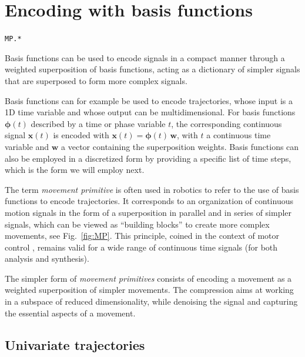 \documentclass[10pt,a4paper]{article} %
\newcommand{\filename}[1]{\colorbox{rr2}{\color{white}\texttt{#1}}}
\begin{document}
\section{Encoding with basis functions}\label{sec:basisfcts}
\begin{flushright}
\filename{MP.*}
\end{flushright}

Basis functions can be used to encode signals in a compact manner through a weighted superposition of basis functions, acting as a dictionary of simpler signals that are superposed to form more complex signals. %

Basis functions can for example be used to encode trajectories, whose input is a 1D time variable and whose output can be multidimensional. For basis functions $\bm{\phi}(t)$ described by a time or phase variable $t$, the corresponding continuous signal $\bm{x}(t)$ is encoded with $\bm{x}(t) = \bm{\phi}(t) \, \bm{w}$, with $t$ a continuous time variable and $\bm{w}$ a vector containing the superposition weights. Basis functions can also be employed in a discretized form by providing a specific list of time steps, which is the form we will employ next. 

The term \emph{movement primitive} is often used in robotics to refer to the use of basis functions to encode trajectories. It corresponds to an organization of continuous motion signals in the form of a superposition in parallel and in series of simpler signals, which can be viewed as ``building blocks'' to create more complex movements, see Fig.~\ref{fig:MP}. This principle, coined in the context of motor control \cite{MussaIvaldi94}, remains valid for a wide range of continuous time signals (for both analysis and synthesis).

The simpler form of \emph{movement primitives} consists of encoding a movement as a weighted superposition of simpler movements. The compression aims at working in a subspace of reduced dimensionality, while denoising the signal and capturing the essential aspects of a movement. 

\subsection{Univariate trajectories}
\end{document}
